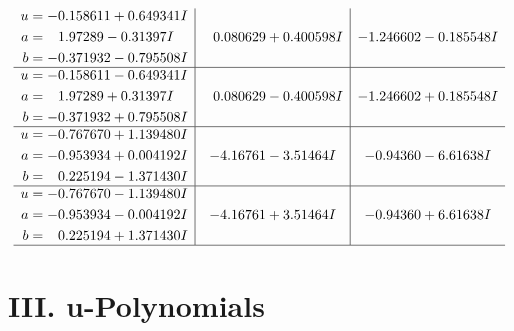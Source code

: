 \documentclass[1p]{elsarticle_modified}
\theoremstyle{definition}
\begin{document}
$$\begin{array}{c|c|c}
\begin{aligned}
u &= -0.158611 + 0.649341 I \\
a &= \phantom{-}1.97289 - 0.31397 I \\
b &= -0.371932 - 0.795508 I\end{aligned}
 & \phantom{-}0.080629 + 0.400598 I & -1.246602 - 0.185548 I \\ \hline\begin{aligned}
u &= -0.158611 - 0.649341 I \\
a &= \phantom{-}1.97289 + 0.31397 I \\
b &= -0.371932 + 0.795508 I\end{aligned}
 & \phantom{-}0.080629 - 0.400598 I & -1.246602 + 0.185548 I \\ \hline\begin{aligned}
u &= -0.767670 + 1.139480 I \\
a &= -0.953934 + 0.004192 I \\
b &= \phantom{-}0.225194 - 1.371430 I\end{aligned}
 & -4.16761 - 3.51464 I & -0.94360 - 6.61638 I \\ \hline\begin{aligned}
u &= -0.767670 - 1.139480 I \\
a &= -0.953934 - 0.004192 I \\
b &= \phantom{-}0.225194 + 1.371430 I\end{aligned}
 & -4.16761 + 3.51464 I & -0.94360 + 6.61638 I\\
 \hline 
 \end{array}$$\newpage
\newpage\renewcommand{\arraystretch}{1}
\centering \section*{ III. u-Polynomials}
\end{document}
